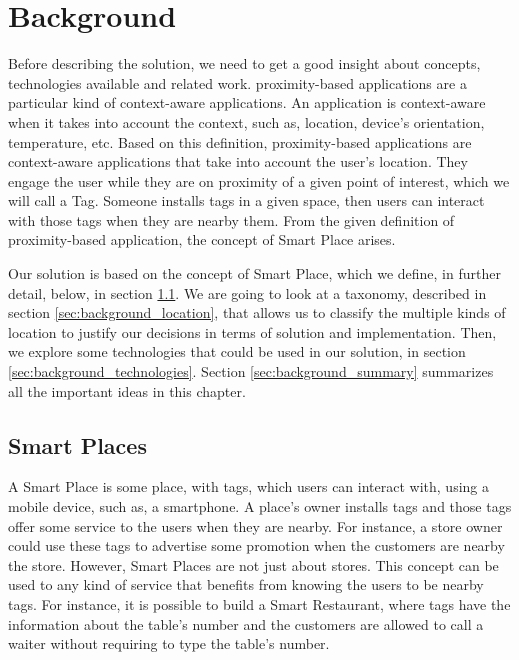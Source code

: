 
\chapter{Background}
\label{chapter:background}
Before describing the solution, we need to get a good insight about concepts, technologies available and related work.
proximity-based applications are a particular kind of context-aware applications.
An application is context-aware when it takes into account the context, such as, location, device's orientation, temperature, etc.
Based on this definition, proximity-based applications are context-aware applications that take into account the user's location.
They engage the user while they are on proximity of a given point of interest, which we will call a Tag.
Someone installs tags in a given space, then users can interact with those tags when they are nearby them.
From the given definition of proximity-based application, the concept of Smart Place arises.

Our solution is based on the concept of Smart Place, which we define, in further detail, below, in section \ref{sec:background_smart_places}.
We are going to look at a taxonomy, described in section \ref{sec:background_location}, that allows us to classify the multiple kinds of location to justify our decisions in terms of solution and implementation.
Then, we explore some technologies that could be used in our solution, in section \ref{sec:background_technologies}.
Section \ref{sec:background_summary} summarizes all the important ideas in this chapter.

\section{Smart Places}
\label{sec:background_smart_places}
A Smart Place is some place, with tags, which users can interact with, using a mobile device, such as, a smartphone.
A place's owner installs tags and those tags offer some service to the users when they are nearby.
For instance, a store owner could use these tags to advertise some promotion when the customers are nearby the store.
However, Smart Places are not just about stores.
This concept can be used to any kind of service that benefits from knowing the users to be nearby tags.
For instance, it is possible to build a Smart Restaurant, where tags have the information about the table's number and the customers are allowed to call a waiter without requiring to type the table's number.

